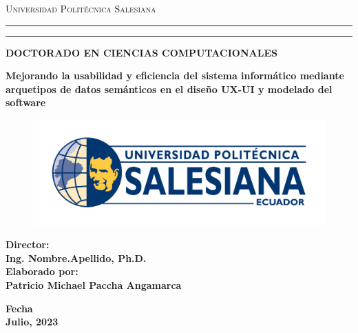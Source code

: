 \newcommand\patTitulo
    { Mejorando la usabilidad y eficiencia del sistema informático mediante arquetipos de datos semánticos en el diseño UX-UI y modelado del software}
\newcommand\patTituloMayus
    {{\textsc \patTitulo}}
\newcommand\patNombre
    {Patricio Michael Paccha Angamarca}
\newcommand\patKeywords
    {Semantic data archetypes, UX-UI design, Software modeling, Software design pattern}

     \thispagestyle{empty}%
 \begin{titlepage}
    \begin{center}

{{\Large{\textsc{Universidad Politécnica Salesiana}}}} \rule[0.1cm]{16cm}{0.1mm}
\rule[0.5cm]{16cm}{0.6mm}
{\Large{\bf 
    DOCTORADO EN CIENCIAS COMPUTACIONALES 
}}
\end{center}
\vspace{15mm}
\begin{center}
{\LARGE{\bf 
    \patTituloMayus
}}\\
\vspace{6mm}
\end{center}
\vspace{22mm}
\par
\noindent

\begin{figure}
\begin{center}
\includegraphics[scale=0.3]{logoups.png}
\vspace{-0.2cm} 
\end{center}
\end{figure}


\begin{minipage}[t]{0.57\textwidth}
{\large{\bf Director:\\
Ing. Nombre.Apellido, Ph.D. \\
{\vskip 5mm} Elaborado por:\\
    \patNombre
}}
\end{minipage}
\hfill
\vspace{10mm}
\begin{center}
{\large{\bf 
    Fecha\\
    Julio, 2023 }}%
\end{center}
\end{titlepage}
